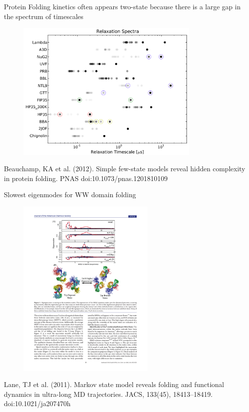 \documentclass{beamer}
\begin{document}
\begin{frame}{Protein Folding kinetics often appears two-state because there is a large gap in the spectrum of timescales}

\begin{figure}
\includegraphics[width=0.8\textwidth]{beauchamp}
\end{figure}

\tiny
Beauchamp, KA et al. (2012). Simple few-state models reveal hidden complexity in protein folding. PNAS doi:10.1073/pnas.1201810109
\normalsize

\end{frame}

\begin{frame}{Slowest eigenmodes for WW domain folding}

\begin{figure}
\includegraphics[width=0.6\textwidth]{ww-eigenmodes}
\end{figure}

\tiny
Lane, TJ et al. (2011).  Markov state model reveals folding and functional dynamics in ultra-long MD trajectories. JACS, 133(45), 18413–18419. doi:10.1021/ja207470h
\normalsize

\end{frame}
\end{document}
